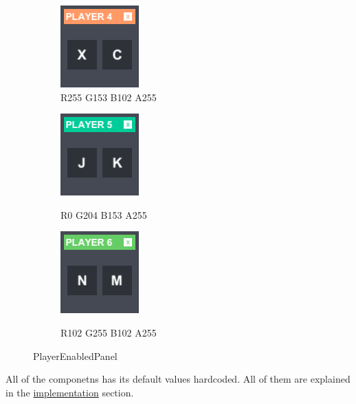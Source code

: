 \begin{figure}[h]
\begin{subfigure}{0.22\textwidth}
\includegraphics[scale=1]{player4enabledpanel}
\caption*{\hspace*{-0.351cm}R255 G153 B102 A255}
\end{subfigure}
\begin{subfigure}{0.22\textwidth}
\includegraphics[scale=1]{player5enabledpanel}
\label{fig:b}
\caption*{\hspace*{-0.35cm}R0 G204 B153 A255}
\end{subfigure}
\begin{subfigure}{0.22\textwidth}
\includegraphics[scale=1]{player6enabledpanel}
\label{fig:b}
\caption*{\hspace*{-0.35cm}R102 G255 B102 A255}
\end{subfigure}
\caption{PlayerEnabledPanel}
\end{figure}

\noindent All of the componetns has its default values hardcoded. All of them are explained in the \hyperref[gui-implementation]{implementation} section.

